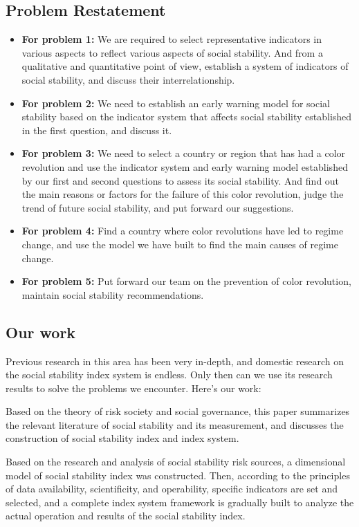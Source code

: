 \documentclass[12pt]{article}  %
\begin{document}
\subsection{Problem Restatement}
\begin{itemize}
\item \textbf{For problem 1:} We are required to select representative indicators in various aspects to reflect various aspects of social stability. And from a qualitative and quantitative point of view, establish a system of indicators of social stability, and discuss their interrelationship.
\item \textbf{For problem 2:} We need to establish an early warning model for social stability based on the indicator system that affects social stability established in the first question, and discuss it.
\item \textbf{For problem 3:} We need to select a country or region that has had a color revolution and use the indicator system and early warning model established by our first and second questions to assess its social stability. And find out the main reasons or factors for the failure of this color revolution, judge the trend of future social stability, and put forward our suggestions.
\item \textbf{For problem 4:} Find a country where color revolutions have led to regime change, and use the model we have built to find the main causes of regime change.
\item \textbf{For problem 5:} Put forward our team on the prevention of color revolution, maintain social stability recommendations.
\end{itemize}
\subsection{Our work}
Previous research in this area has been very in-depth, and domestic research on the social stability index system is endless. Only then can we use its research results to solve the problems we encounter. Here's our work:

Based on the theory of risk society and social governance, this paper summarizes the relevant literature of social stability and its measurement, and discusses the construction of social stability index and index system. 

Based on the research and analysis of social stability risk sources, a dimensional model of social stability index was constructed. Then, according to the principles of data availability, scientificity, and operability, specific indicators are set and selected, and a complete index system framework is gradually built to analyze the actual operation and results of the social stability index.
\end{document}
